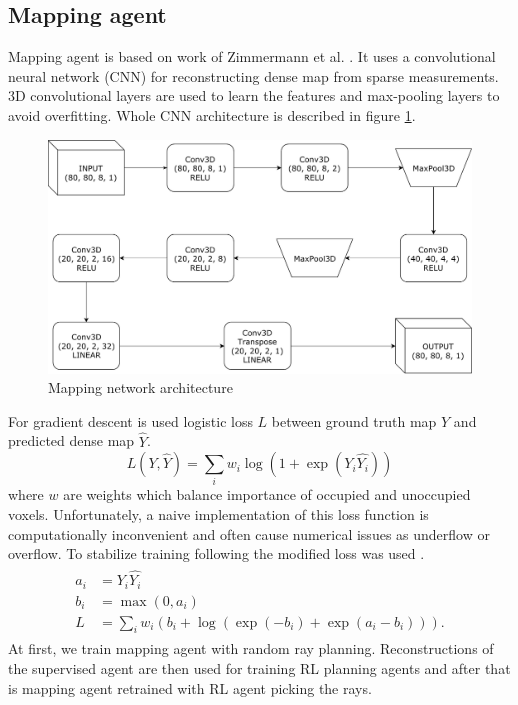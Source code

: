 \subsection{Mapping agent}
Mapping agent is based on work of Zimmermann et al. \cite{zimmermann2017}. It uses a convolutional neural network (CNN) for reconstructing dense map from sparse measurements. 3D convolutional layers are used to learn the features and max-pooling layers to avoid overfitting. Whole CNN architecture is described in figure \ref{fig:supervised}.
\vspace{3mm}
\begin{figure}[!h]
\centering
\includegraphics[scale=0.6]{fig/supervised.pdf}
\caption{Mapping network architecture}
\label{fig:supervised}
\end{figure}

For gradient descent is used logistic loss $L$ between ground truth map $Y$ and predicted dense map $\hat{Y}$.
\begin{equation} \label{eq:loglos}
L(Y, \hat{Y}) = \sum\limits_i w_i \log(1 + \exp(Y_i \hat{Y_i}))
\end{equation}
where $w$ are weights which balance importance of occupied and unoccupied voxels.
\pagebreak
Unfortunately, a naive implementation of this loss function is computationally inconvenient and often cause numerical issues as underflow or overflow. To stabilize training following the modified loss was used \cite{matconvnet2015}.
\begin{align} 
\begin{split}
a_i &= Y_i \hat{Y_i} \\
b_i &= \max(0, a_i) \\
L &= \sum\limits_i w_i (b_i + \log(\exp(-b_i) + \exp(a_i-b_i))).
\end{split}
\end{align}
At first, we train mapping agent with random ray planning. Reconstructions of the supervised agent are then used for training RL planning agents and after that is mapping agent retrained with RL agent picking the rays.
